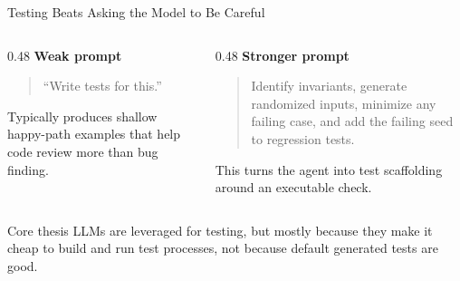 \begin{frame}{Testing Beats Asking the Model to Be Careful}
  \begin{columns}[T, onlytextwidth]
    \begin{column}{0.48\textwidth}
      \textbf{Weak prompt}\\[0.3em]
      \begin{quote}
        \small ``Write tests for this.''
      \end{quote}
      \vspace{0.4em}
      Typically produces shallow happy-path examples that help code review more than bug finding.
    \end{column}
    \hfill
    \begin{column}{0.48\textwidth}
      \textbf{Stronger prompt}\\[0.3em]
      \begin{quote}
        \small Identify invariants, generate randomized inputs, minimize any failing case, and add the failing seed to regression tests.
      \end{quote}
      \vspace{0.4em}
      This turns the agent into test scaffolding around an executable check.
    \end{column}
  \end{columns}
  \vspace{0.5em}
  \begin{block}{Core thesis}
    LLMs are leveraged for testing, but mostly because they make it cheap to build and run test processes, not because default generated tests are good.
  \end{block}
\end{frame}

